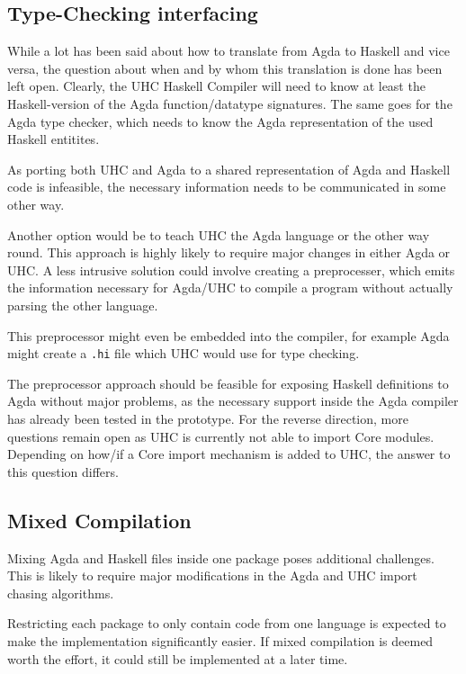 \documentclass[12pt, a4paper, twoside]{report}
\begin{document}
\subsection{Type-Checking interfacing}


While a lot has been said about how to translate from Agda to Haskell and vice versa,
the question about when and by whom this translation is done has been left open. Clearly,
the UHC Haskell Compiler will need to know at least the Haskell-version of the Agda
function/datatype signatures. The same goes for the Agda type checker, which needs to
know the Agda representation of the used Haskell entitites.

As porting both UHC and Agda to a shared representation of Agda and Haskell code
is infeasible, the necessary information needs to be communicated in some other way.


Another option would be to teach UHC the Agda language or the other way round. This approach
is highly likely to require major changes in either Agda or UHC.
A less intrusive solution could involve creating a preprocesser, which emits the
information necessary for Agda/UHC to compile a program without actually parsing
the other language. 

This preprocessor might even be embedded into the compiler, for example Agda might create
a \texttt{.hi} file which UHC would use for type checking.

The preprocessor approach should be feasible for exposing Haskell definitions to Agda
without major problems, as the necessary support inside the Agda compiler has already
been tested in the prototype.
For the reverse direction, more questions remain open as UHC is currently not able
to import Core modules. Depending on how/if a Core import mechanism is added to UHC,
the answer to this question differs.


\subsection{Mixed Compilation}
Mixing Agda and Haskell files inside one package poses additional challenges. This is likely to require
major modifications in the Agda and UHC import chasing algorithms.

Restricting each package to only contain code from one language is expected to make the implementation
significantly easier. If mixed compilation is deemed worth the effort, it could still be implemented
at a later time.
\end{document}
